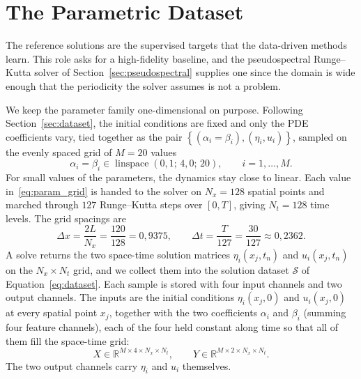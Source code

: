 \section{The Parametric Dataset}
\label{sec:m_dataset}

The reference solutions are the supervised targets that the data-driven methods learn. This role asks for a high-fidelity baseline, and the pseudospectral Runge--Kutta solver of Section~\ref{sec:pseudospectral} supplies one since the domain is wide enough that the periodicity the solver assumes is not a problem.

We keep the parameter family one-dimensional on purpose. Following Section~\ref{sec:dataset}, the initial conditions are fixed and only the PDE coefficients vary, tied together as the pair $\left\{ (\alpha_i = \beta_i), (\eta_i, u_i) \right\}$, sampled on the evenly spaced grid of $M = 20$ values
\begin{equation}\label{eq:param_grid}
    \alpha_i = \beta_i \in \operatorname{linspace}(0{,}1;\, 4{,}0;\, 20), \qquad i = 1, \dots, M.
\end{equation}
For small values of the parameters, the dynamics stay close to linear. Each value in~\eqref{eq:param_grid} is handed to the solver on $N_x = 128$ spatial points and marched through $127$ Runge--Kutta steps over $[0, T]$, giving $N_t = 128$ time levels. The grid spacings are
\begin{equation}\label{eq:m_spacings}
    \Delta x = \frac{2L}{N_x} = \frac{120}{128} = 0{,}9375,
    \qquad
    \Delta t = \frac{T}{127} = \frac{30}{127} \approx 0{,}2362.
\end{equation}
A solve returns the two space-time solution matrices $\eta_i(x_j, t_n)$ and $u_i(x_j, t_n)$ on the $N_x \times N_t$ grid, and we collect them into the solution dataset $\mathcal{S}$ of Equation~\eqref{eq:dataset}. Each sample is stored with four input channels and two output channels. The inputs are the initial conditions $\eta_i(x_j, 0)$ and $u_i(x_j, 0)$ at every spatial point $x_j$, together with the two coefficients $\alpha_i$ and $\beta_i$ (summing four feature channels), each of the four held constant along time so that all of them fill the space-time grid:
\begin{equation}\label{eq:m_tensors}
    X \in \mathbb{R}^{M \times 4 \times N_x \times N_t},
    \qquad
    Y \in \mathbb{R}^{M \times 2 \times N_x \times N_t}.
\end{equation}
The two output channels carry $\eta_i$ and $u_i$ themselves.

